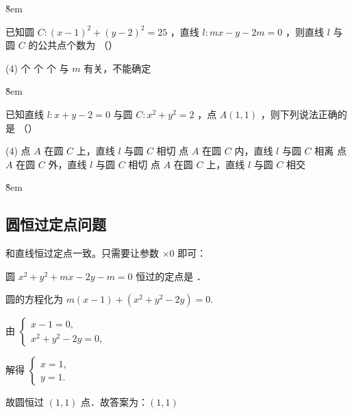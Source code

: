\v{8em}

\begin{example}
    已知圆 $C:(x-1)^2+(y-2)^2=25$ ，直线 $l: m x-y-2 m=0$ ，则直线 $l$ 与圆 $C$ 的公共点个数为 （\qquad）
    \begin{tasks}(4)
         个
         个
         个
        \task 与 $m$ 有关，不能确定
    \end{tasks}
\end{example}

\v{8em}

\begin{example}
    已知直线 $l: x+y-2=0$ 与圆 $C: x^2+y^2=2$ ，点 $A(1,1)$ ，则下列说法正确的是 （\qquad）
    \begin{tasks}(4)
        \task 点 $A$ 在圆 $C$ 上，直线 $l$ 与圆 $C$ 相切
        \task 点 $A$ 在圆 $C$ 内，直线 $l$ 与圆 $C$ 相离
        \task 点 $A$ 在圆 $C$ 外，直线 $l$ 与圆 $C$ 相切
        \task 点 $A$ 在圆 $C$ 上，直线 $l$ 与圆 $C$ 相交
    \end{tasks}
\end{example}

\v{8em}

\subsection{圆恒过定点问题}

\begin{theorem}
    和直线恒过定点一致。只需要让参数 $\times 0$ 即可：
\end{theorem}

\begin{example}
    圆 $x^2+y^2+m x-2 y-m=0$ 恒过的定点是 \underline{\qquad}．
\end{example}

\begin{solution}
    圆的方程化为 $m(x-1)+\left(x^2+y^2-2 y\right)=0$.

    由 $\left\{\begin{array}{l}x-1=0, \\ x^2+y^2-2 y=0,\end{array}\right.$

    解得 $\left\{\begin{array}{c}x=1, \\ y=1 .\end{array}\right.$

    故圆恒过 $(1,1)$ 点．故答案为：$(1,1)$
\end{solution}

